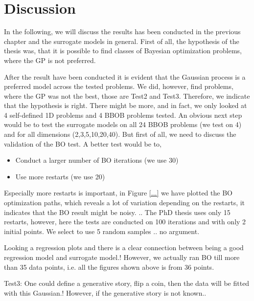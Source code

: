 \chapter{Discussion}
In the following, we will discuss the results has been conducted in the previous chapter and the
surrogate models in general. First of all, the hypothesis of the thesis was, that it is possible 
to find classes of Bayesian optimization problems, where the GP is not preferred. 

After the result have been conducted it is evident that the Gaussian process is a preferred model
across the tested problems. We did, however, find problems, where the GP was not the best, those are
Test2 and Test3. Therefore, we indicate that the hypothesis is right. There might be more, and in
fact, we only looked at 4 self-defined 1D problems and 4 BBOB problems tested. An obvious next step
would be to test the surrogate models on all 24 BBOB problems (we test on 4) and for all dimensions
(2,3,5,10,20,40). But first of all, we need to discuss the validation of the BO test. A better test
would be to,
\begin{itemize}[noitemsep]
    \item Conduct a larger number of BO iterations (we use 30)
    \item Use more restarts (we use 20)
\end{itemize}
Especially more restarts is important, in Figure \ref{...} we have plotted the BO optimization
paths, which reveals a lot of variation depending on the restarts, it indicates that the BO result
might be noisy. .. The PhD thesis \cite{PhDthesis} uses only 15 restarts, however, here the tests are
conducted on 100 iterations and with only 2 initial points. We select to use 5 random samples .. no
argument. 







Looking a regression plots and there is a clear connection between being a good regression
model and surrogate model.! However, we actually ran BO till more than 35 data points, i.e. 
all the figures shown above is from 36 points. 


Test3: One could define a generative story, flip a coin, then the data will
be fitted with this Gaussian.! However, if the generative story is not known..

